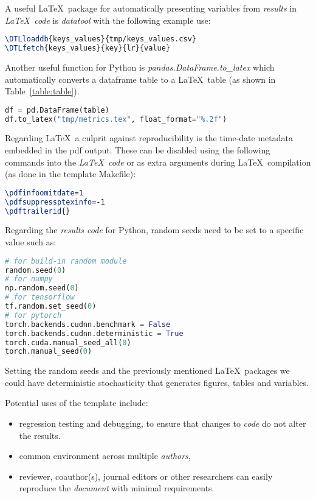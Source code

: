 \documentclass[journal]{IEEEtran}
\begin{document}
A useful \LaTeX\ package for automatically presenting variables from \textit{results} in \textit{\LaTeX\ code} is \textit{datatool} with the following example use:
\begin{lstlisting}[language=TeX, style=lststyle, caption={\LaTeX\ datatool example of loading a file that contains pairs of keys and values (tmp/keys\_values.csv) generated by a \textit{results code} and getting the value of a key named lr.}]
\DTLloaddb{keys_values}{tmp/keys_values.csv}
\DTLfetch{keys_values}{key}{lr}{value}
\end{lstlisting}

Another useful function for Python is \textit{pandas.DataFrame.to\_latex} which automatically converts a dataframe table to a \LaTeX\ table (as shown in Table~\ref{table:table}).
\begin{lstlisting}[language=python, style=lststyle, caption={Convert Pandas DataFrame to \LaTeX\ table.}]
df = pd.DataFrame(table)
df.to_latex("tmp/metrics.tex", float_format="%.2f")
\end{lstlisting}

Regarding \LaTeX\ a culprit against reproducibility is the time-date metadata embedded in the pdf output.
These can be disabled using the following commands into the \textit{\LaTeX\ code} or as extra arguments during \LaTeX\ compilation (as done in the template Makefile):
\begin{lstlisting}[language=TeX, style=lststyle, caption={\LaTeX\ pdf reproducibility commands.}]
\pdfinfoomitdate=1
\pdfsuppressptexinfo=-1
\pdftrailerid{}
\end{lstlisting}

Regarding the \textit{results code} for Python, random seeds need to be set to a specific value such as:
\begin{lstlisting}[language=python, style=lststyle, caption={Python reproducibility commands for some popular libraries.}]
# for build-in random module
random.seed(0)
# for numpy
np.random.seed(0)
# for tensorflow
tf.random.set_seed(0)
# for pytorch
torch.backends.cudnn.benchmark = False
torch.backends.cudnn.deterministic = True
torch.cuda.manual_seed_all(0)
torch.manual_seed(0)
\end{lstlisting}

Setting the random seeds and the previously mentioned \LaTeX\ packages we could have deterministic stochasticity that generates figures, tables and variables.

Potential uses of the template include:
\begin{itemize}
	\item regression testing and debugging, to ensure that changes to \textit{code} do not alter the results.
	\item common environment across multiple \textit{authors},
	\item reviewer, coauthor(s), journal editors or other researchers can easily reproduce the \textit{document} with minimal requirements.
\end{itemize}
\end{document}
